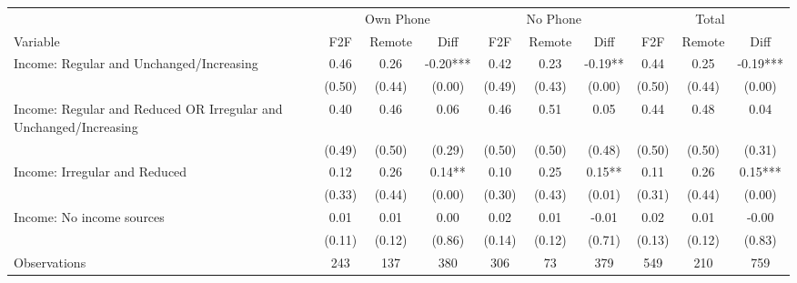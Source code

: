 \begin{tabular}{l*{9}c}
\hline\hline
 & \multicolumn{3}{c}{Own Phone} & \multicolumn{3}{c}{No Phone} & \multicolumn{3}{c}{Total}\\ 
Variable & F2F & Remote & Diff & F2F & Remote & Diff & F2F & Remote & Diff \\
\hline
Income: Regular and Unchanged/Increasing&0.46&0.26&-0.20***&0.42&0.23&-0.19**&0.44&0.25&-0.19***\\
&(0.50)&(0.44)&(0.00)&(0.49)&(0.43)&(0.00)&(0.50)&(0.44)&(0.00)\\
Income: Regular and Reduced OR Irregular and Unchanged/Increasing&0.40&0.46&0.06&0.46&0.51&0.05&0.44&0.48&0.04\\
&(0.49)&(0.50)&(0.29)&(0.50)&(0.50)&(0.48)&(0.50)&(0.50)&(0.31)\\
Income: Irregular and Reduced&0.12&0.26&0.14**&0.10&0.25&0.15**&0.11&0.26&0.15***\\
&(0.33)&(0.44)&(0.00)&(0.30)&(0.43)&(0.01)&(0.31)&(0.44)&(0.00)\\
Income: No income sources&0.01&0.01&0.00&0.02&0.01&-0.01&0.02&0.01&-0.00\\
&(0.11)&(0.12)&(0.86)&(0.14)&(0.12)&(0.71)&(0.13)&(0.12)&(0.83)\\
\hline
Observations & 243 & 137 & 380 & 306 & 73 & 379 & 549 & 210 & 759 \\
\hline\hline
\end{tabular}
